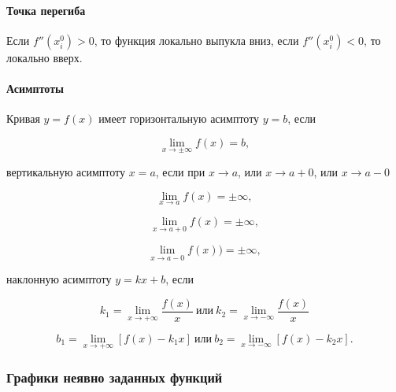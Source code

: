 		    \paragraph{Точка перегиба}

			    Если $f'' (x^{0}_{i}) > 0$, то функция локально выпукла вниз, если $f'' (x^{0}_{i}) < 0$, то локально вверх.

		    \paragraph{Асимптоты}

			    Кривая $y = f \left( x \right)$ имеет горизонтальную асимптоту $y = b$, если

			    \begin{equation}
			        \lim_{x \rightarrow \pm \infty} f \left( x \right) = b,
			    \end{equation}

				вертикальную асимптоту $x = a$, если при $x \rightarrow a$, или $x \rightarrow a + 0$, или $x \rightarrow a - 0$

				\begin{equation}
					\lim_{x \rightarrow a} f \left( x \right) = \pm \infty,
				\end{equation}

				\begin{equation}
					\lim_{x \rightarrow a + 0} f \left( x \right) = \pm \infty,
				\end{equation}

				\begin{equation}
					\lim_{x \rightarrow a - 0} f \left( x \right)) = \pm \infty,
				\end{equation}

				наклонную асимптоту $y = k x + b$, если

				\begin{equation}
					k_{1} = \lim_{x \rightarrow + \infty} \frac{f \left( x \right)}{x} \: \mbox{или} \: k_{2} = \lim_{x \rightarrow - \infty} \frac{f \left( x \right)}{x}
				\end{equation}

				\begin{equation}
					b_{1} = \lim_{x \rightarrow + \infty} \left[ f \left( x \right) - k_{1} x \right] \: \mbox{или} \: b_{2} = \lim_{x \rightarrow - \infty} \left[ f \left( x \right) - k_{2} x \right].
				\end{equation}

		\subsubsection*{Графики неявно заданных функций}

